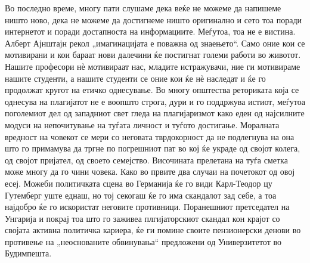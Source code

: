 \documentclass[12pt,a4paper]{article}
\begin{document}
Во последно време, многу пати слушаме дека веќе не можеме да напишеме ништо
ново, дека не можеме да достигнеме ништо оригинално и сето тоа поради интернетот
и поради достапноста на информациите. Меѓутоа, тоа не е вистина. Алберт
Ајнштајн рекол „имагинацијата е поважна од знаењето“. Само оние кои се
мотивирани и кои бараат нови далечини ќе постигнат големи работи во животот.
Нашите професори нѐ мотивираат нас, младите истражувачи, ние ги мотивираме
нашите студенти, а нашите студенти се оние кои ќе нѐ наследат и ќе го продолжат
кругот на етичко однесување. Во многу општества реториката која се однесува на
плагијатот не е воопшто строга, дури и го поддржува истиот, меѓутоа поголемиот
дел од западниот свет гледа на плагијаризмот како еден од најсилните модуси на
непочитување на туѓата личност и туѓото достигање. Моралната вредност на
човекот се мери со неговата тврдокорност да не подлегнува на она што го
примамува да тргне по погрешниот пат во кој ќе украде од својот колега, од својот пријател,
од своето семејство. Височината прелетана на туѓа сметка може многу да го чини
човека. Како во првите два случаи на почетокот од овој есеј. Можеби политичката
сцена во Германија ќе го види Карл-Теодор цу Гутемберг уште еднаш, но тој
секогаш ќе го има скандалот зад себе, а тоа најдобро ќе го искористат неговите
противници. Поранешниот претседател на Унгарија и покрај тоа што го заживеа
плгијаторскиот скандал кон крајот со својата активна политичка кариера, ќе ги
помине своите пензионерски денови во противење на „неоснованите обвинувања“
предложени од Универзитетот во Будимпешта.
\end{document}
